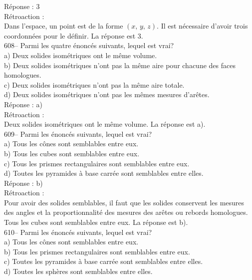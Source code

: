 ﻿\documentclass[letterpaper, 12pt]{article}
\begin{document}
R\'eponse : 3\\

R\'etroaction : \\
Dans l'espace, un point est de la forme $\left(x,\,y,\,z\right) $.  Il est
n\'ecessaire d'avoir trois coordonn\'ees pour le d\'efinir.  La r\'eponse
est 3.\\

608-- Parmi les quatre \'enonc\'es suivants, lequel est vrai?\\
a) Deux solides isom\'etriques ont le m\^eme volume.\\
b) Deux solides isom\'etriques n'ont pas la m\^eme aire pour chacune des
faces homologues.\\
c) Deux solides isom\'etriques n'ont pas la m\^eme aire totale.\\
d) Deux solides isom\'etriques n'ont pas les m\^emes mesures d'ar\^etes.\\


R\'eponse : a)\\

R\'etroaction : \\
Deux solides isom\'etriques ont le m\^eme volume.  La r\'eponse est a).\\

609-- Parmi les \'enonc\'es suivants, lequel est vrai?\\
a) Tous les c\^ones sont semblables entre eux.\\
b) Tous les cubes sont semblables entre eux.\\
c) Tous les prismes rectangulaires sont semblables entre eux.\\
d) Toutes les pyramides \`a base carr\'ee sont semblables entre elles.\\

R\'eponse : b)\\

R\'etroaction : \\
Pour avoir des solides semblables, il faut que les solides conservent les
mesures des angles et la proportionnalit\'e des mesures des ar\^etes ou
rebords homologues.  Tous les cubes sont semblables entre eux.  La r\'eponse
est b).\\

610-- Parmi les \'enonc\'es suivants, lequel est vrai?\\
a) Tous les c\^ones sont semblables entre eux.\\
b) Tous les prismes rectangulaires sont semblables entre eux.\\
c) Toutes les pyramides \`a base carr\'ee sont semblables entre elles.\\
d) Toutes les sph\`eres sont semblables entre elles.\\
\end{document}

